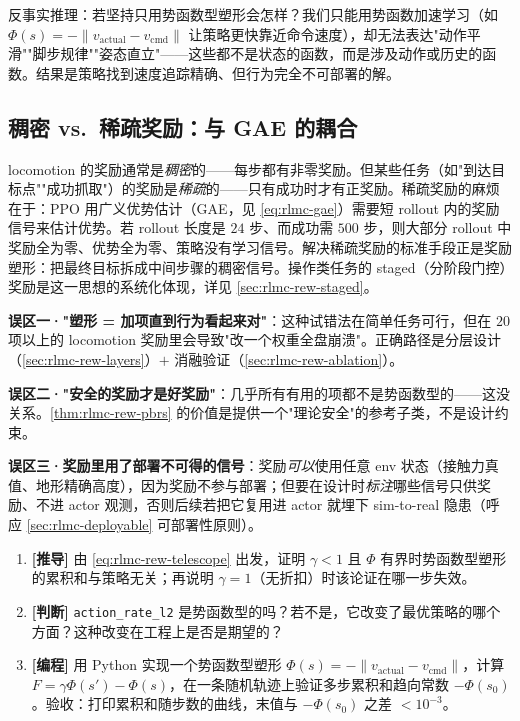 反事实推理：若坚持只用势函数型塑形会怎样？我们只能用势函数加速学习（如 $\Phi(s)=-\lVert v_{\text{actual}}-v_{\text{cmd}}\rVert$ 让策略更快靠近命令速度），却无法表达"动作平滑""脚步规律""姿态直立"——这些都不是状态的函数，而是涉及动作或历史的函数。结果是策略找到速度追踪精确、但行为完全不可部署的解。

\subsection{稠密 vs.\ 稀疏奖励：与 GAE 的耦合}
\label{sec:rlmc-rew-densesparse}

locomotion 的奖励通常是\emph{稠密}的——每步都有非零奖励。但某些任务（如"到达目标点""成功抓取"）的奖励是\emph{稀疏}的——只有成功时才有正奖励。稀疏奖励的麻烦在于：PPO 用广义优势估计（GAE，见 \cref{eq:rlmc-gae}）需要短 rollout 内的奖励信号来估计优势。若 rollout 长度是 $24$ 步、而成功需 $500$ 步，则大部分 rollout 中奖励全为零、优势全为零、策略没有学习信号。解决稀疏奖励的标准手段正是奖励塑形：把最终目标拆成中间步骤的稠密信号。操作类任务的 staged（分阶段门控）奖励是这一思想的系统化体现，详见 \cref{sec:rlmc-rew-staged}。

\begin{pitfall}[本节三个高频认知误区]
\textbf{误区一·"塑形 = 加项直到行为看起来对"}：这种试错法在简单任务可行，但在 $20$ 项以上的 locomotion 奖励里会导致"改一个权重全盘崩溃"。正确路径是分层设计（\cref{sec:rlmc-rew-layers}）$+$ 消融验证（\cref{sec:rlmc-rew-ablation}）。

\textbf{误区二·"安全的奖励才是好奖励"}：几乎所有有用的项都不是势函数型的——这没关系。\cref{thm:rlmc-rew-pbrs} 的价值是提供一个"理论安全"的参考子类，不是设计约束。

\textbf{误区三·奖励里用了部署不可得的信号}：奖励\emph{可以}使用任意 env 状态（接触力真值、地形精确高度），因为奖励不参与部署；但要在设计时\emph{标注}哪些信号只供奖励、不进 actor 观测，否则后续若把它复用进 actor 就埋下 sim-to-real 隐患（呼应 \cref{sec:rlmc-deployable} 可部署性原则）。
\end{pitfall}

\begin{practice}[练习·理论基础]
\begin{enumerate}
  \item \textbf{[推导]} 由 \cref{eq:rlmc-rew-telescope} 出发，证明 $\gamma<1$ 且 $\Phi$ 有界时势函数型塑形的累积和与策略无关；再说明 $\gamma=1$（无折扣）时该论证在哪一步失效。
  \item \textbf{[判断]} \verb|action_rate_l2| 是势函数型的吗？若不是，它改变了最优策略的哪个方面？这种改变在工程上是否是期望的？
  \item \textbf{[编程]} 用 Python 实现一个势函数型塑形 $\Phi(s)=-\lVert v_{\text{actual}}-v_{\text{cmd}}\rVert$，计算 $F=\gamma\Phi(s')-\Phi(s)$，在一条随机轨迹上验证多步累积和趋向常数 $-\Phi(s_0)$。验收：打印累积和随步数的曲线，末值与 $-\Phi(s_0)$ 之差 $<10^{-3}$。
\end{enumerate}
\end{practice}

